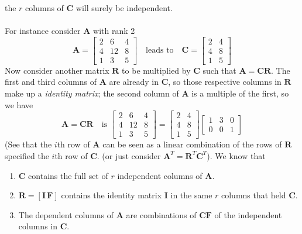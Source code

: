 \documentclass{report}
\begin{document}
the $r$ columns of $\bm C$ will surely be independent.\\
\vspace{1mm}\\
For instance consider $\bm A$ with rank 2
\begin{equation*}
\bm A=\left[\begin{array}{ccc}
2&6&4\\
4&12&8\\
1&3&5
\end{array}\right]\quad\text{leads to}\quad \bm C=
\left[\begin{array}{cc}
2&4\\
4&8\\
1&5
\end{array}\right]
\end{equation*}
Now consider another matrix $\bm R$ to be multiplied by $\bm C$ such that 
$\bm A=\bm{CR}$. The first and third columns of $\bm A$ are already in $\bm C$, so those respective columns in $\bm R$ make up a \textit{identity matrix};
the second column of $\bm A$ is a multiple of the first, so we have
\begin{equation*}
\bm A=\bm{CR}\quad\text{is }\left[\begin{array}{ccc}
2&6&4\\
4&12&8\\
1&3&5
\end{array}\right]=
\left[\begin{array}{cc}
2&4\\
4&8\\
1&5
\end{array}\right]
\left[\begin{array}{ccc}
1&3&0\\
0&0&1
\end{array}\right]
\end{equation*}
(See that the $i$th row of $\bm A$ can be seen as a linear combination of the rows of $\bm R$ specified the $i$th row of $\bm C$. 
(or just consider $\bm A^T=\bm R^T\bm C^T$). We know that
\begin{enumerate}
\item $\bm C$ contains the full set of $r$ independent columns of $\bm A$.
\item $\bm R=[\bm{I\,\bm F}]$ contains the identity matrix $\bm I$ in the same $r$ columns that held $\bm C$.
\item The dependent columns of $\bm A$ are combinations of $\bm{CF}$ of the independent columns in $\bm C$.
\end{enumerate}
\end{document}
